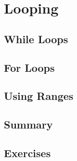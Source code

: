 \chapter{Looping}

\section{While Loops}


\section{For Loops}



\section{Using Ranges}


\section{Summary}


\section{Exercises}

